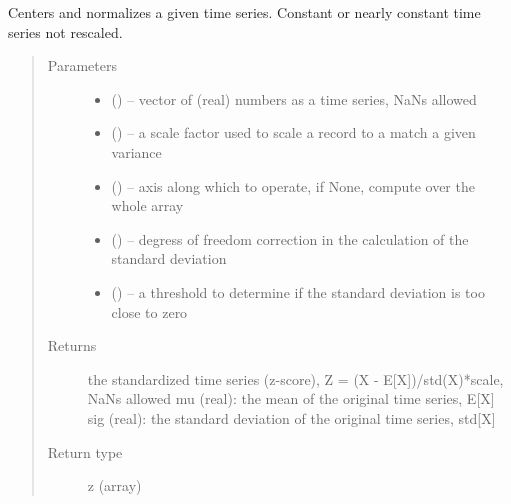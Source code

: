 \documentclass[letterpaper,10pt,english]{sphinxmanual}
\begin{document}

\begin{fulllineitems}
\label{\detokenize{Timeseries:pyleoclim.Timeseries.standardize}}
Centers and normalizes a given time series. Constant or nearly constant time series not rescaled.
\begin{quote}\begin{description}
\item[{Parameters}] \leavevmode\begin{itemize}
\item {} 
 () -- vector of (real) numbers as a time series, NaNs allowed

\item {} 
 () -- a scale factor used to scale a record to a match a given variance

\item {} 
 () -- axis along which to operate, if None, compute over the whole array

\item {} 
 () -- degress of freedom correction in the calculation of the standard deviation

\item {} 
 () -- a threshold to determine if the standard deviation is too close to zero

\end{itemize}

\item[{Returns}] \leavevmode
the standardized time series (z-score), Z = (X - E{[}X{]})/std(X)*scale, NaNs allowed
mu (real): the mean of the original time series, E{[}X{]}
sig (real): the standard deviation of the original time series, std{[}X{]}

\item[{Return type}] \leavevmode
z (array)

\end{description}\end{quote}

\end{fulllineitems}
\end{document}
